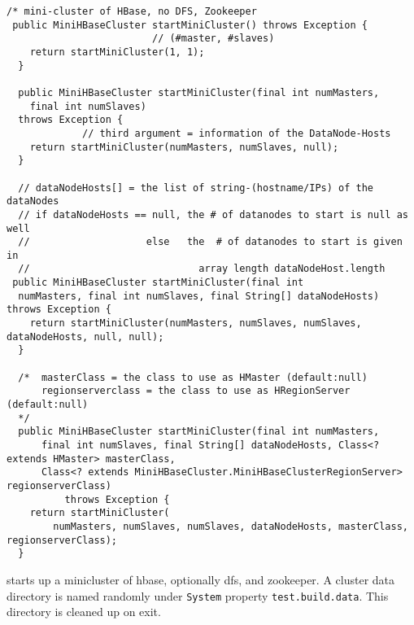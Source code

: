 \begin{verbatim}
/* mini-cluster of HBase, no DFS, Zookeeper
 public MiniHBaseCluster startMiniCluster() throws Exception {
                         // (#master, #slaves)
    return startMiniCluster(1, 1);
  }

  public MiniHBaseCluster startMiniCluster(final int numMasters,
    final int numSlaves)
  throws Exception { 
             // third argument = information of the DataNode-Hosts
    return startMiniCluster(numMasters, numSlaves, null);
  }                              
  
  // dataNodeHosts[] = the list of string-(hostname/IPs) of the dataNodes
  // if dataNodeHosts == null, the # of datanodes to start is null as well
  //                    else   the  # of datanodes to start is given in
  //                             array length dataNodeHost.length
 public MiniHBaseCluster startMiniCluster(final int
  numMasters, final int numSlaves, final String[] dataNodeHosts) throws Exception {
    return startMiniCluster(numMasters, numSlaves, numSlaves, dataNodeHosts, null, null);
  }                                                                                        
  
  /*  masterClass = the class to use as HMaster (default:null)
      regionserverclass = the class to use as HRegionServer (default:null)
  */
  public MiniHBaseCluster startMiniCluster(final int numMasters,
      final int numSlaves, final String[] dataNodeHosts, Class<? extends HMaster> masterClass,
      Class<? extends MiniHBaseCluster.MiniHBaseClusterRegionServer> regionserverClass)
          throws Exception {
    return startMiniCluster(
        numMasters, numSlaves, numSlaves, dataNodeHosts, masterClass, regionserverClass);
  }         
\end{verbatim}
starts up  a minicluster of hbase, optionally dfs, and zookeeper. A cluster data
directory is named randomly under \verb!System! property \verb!test.build.data!.
This directory is cleaned up on exit. 

